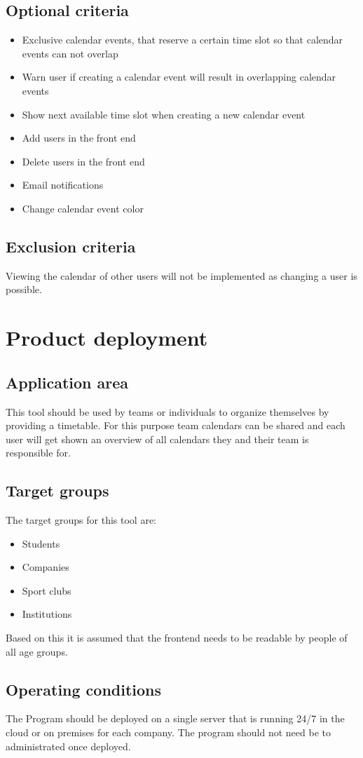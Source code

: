 \documentclass[]{article}
\begin{document}
	\subsection{Optional criteria}
		\begin{itemize}
			\item Exclusive calendar events, that reserve a certain time slot so that calendar events can not overlap
			\item Warn user if creating a calendar event will result in overlapping calendar events
			\item Show next available time slot when creating a new calendar event
			\item Add users in the front end
			\item Delete users in the front end
			\item Email notifications
			\item Change calendar event color
		\end{itemize}
	\subsection{Exclusion criteria}
		Viewing the calendar of other users will not be implemented as changing a user is possible.
\section{Product deployment}
	\subsection{Application area}
		This tool should be used by teams or individuals to organize themselves by providing a timetable. For this purpose team calendars can be shared and each user will get shown an overview of all calendars they and their team is responsible for.
	\subsection{Target groups}
		The target groups for this tool are:
		\begin{itemize}
			\item Students
			\item Companies
			\item Sport clubs
			\item Institutions
		\end{itemize}
		Based on this it is assumed that the frontend needs to be readable by people of all age groups.
	\subsection{Operating conditions}
		The Program should be deployed on a single server that is running 24/7 in the cloud or on premises for each company. The program should not need be to administrated once deployed.
\end{document}

